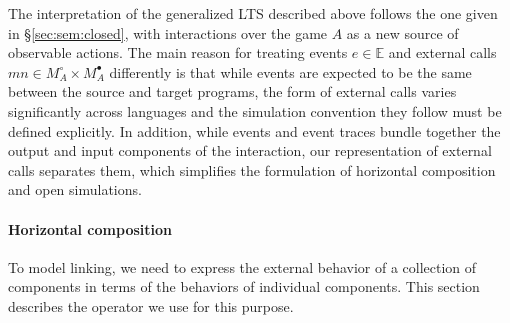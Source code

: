 \documentclass[acmsmall,authordraft]{acmart}
\newcommand{\kw}[1]{\ensuremath{ \mathsf{#1} }}
\newcommand{\bind}{\gg\!\!=}
\newcommand{\que}{\circ}
\newcommand{\ans}{\bullet}
\begin{document}
The interpretation of the generalized LTS described above
follows the one given in \S\ref{sec:sem:closed},
with interactions over the game $A$
as a new source of observable actions.
The main reason for treating
events $e \in \mathbb{E}$ and
external calls $m n \in M_A^\que \times M_A^\ans$
differently is that
while events are expected to be the same
between the source and target programs,
the form of external calls varies significantly
across languages
and the simulation convention they follow
must be defined explicitly.
In addition,
while events and event traces
bundle together the output and input
components of the interaction,
our representation of external calls
separates them,
which simplifies the formulation of
horizontal composition and open simulations.



\paragraph{Horizontal composition} %

To model linking,
we need to express the external behavior
of a collection of components
in terms of the behaviors of
individual components.
This section describes the
operator we use for this purpose.
\end{document}

